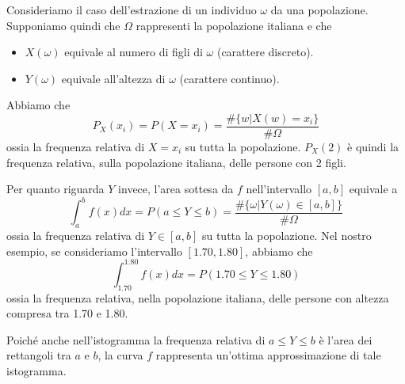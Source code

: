 \begin{example}
	Consideriamo il caso dell'estrazione di un individuo $\omega$ da una popolazione. Supponiamo
	quindi che $\Omega$ rappresenti la popolazione italiana e che
	\begin{itemize}
		\item $X(\omega)$ equivale al numero di figli di $\omega$ (carattere discreto).
		\item $Y(\omega)$ equivale all'altezza di $\omega$ (carattere continuo).
	\end{itemize}
	Abbiamo che
	\[ P_X(x_i) = P(X = x_i) = \frac{\# \{ w | X(w) = x_i\} }{\# \Omega} \]
	ossia la frequenza relativa di $X = x_i$ su tutta la popolazione. $P_X(2)$ è quindi la
	frequenza relativa, sulla popolazione italiana, delle persone con 2 figli.

	Per quanto riguarda $Y$ invece, l'area sottesa da $f$ nell'intervallo $[a,b]$ equivale a
	\[
		\int_a^b f(x) dx = P (a \leq Y \leq b)
		= \frac{\# \{ \omega | Y(\omega) \in [a,b] \}}{\# \Omega}
	\]
	ossia la frequenza relativa di $Y \in [a,b]$ su tutta la popolazione. Nel nostro esempio, se
	consideriamo l'intervallo $[1.70, 1.80]$, abbiamo che
	\[ \int_{1.70}^{1.80} f(x) dx = P (1.70 \leq Y \leq 1.80) \]
	ossia la frequenza relativa, nella popolazione italiana, delle persone con altezza compresa tra
	1.70 e 1.80.

	Poiché anche nell'istogramma la frequenza relativa di $a \leq Y \leq b$ è l'area dei rettangoli
	tra $a$ e $b$, la curva $f$ rappresenta un'ottima approssimazione di tale istogramma.
\end{example}